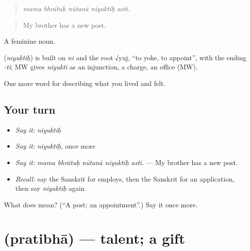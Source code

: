 \begin{quote}
    
\end{quote}

\begin{quote}
\emph{mama bhrātuḥ nūtanā niyuktiḥ asti.}
\end{quote}

\begin{quote}
My brother has a new post.
\end{quote}

A feminine noun.

\begin{cousinweb}
\textbf{} (\emph{niyuktiḥ}) is built on \emph{ni} and the root √yuj, \textquotedblleft{}to yoke, to appoint\textquotedblright{}, with the ending \emph{-ti}; MW gives \emph{niyukti} as an injunction, a charge, an office (MW).
\end{cousinweb}

\begin{grammarlens}[title={What you've built}]
One more word for describing what you lived and felt.
\end{grammarlens}

\subsection*{Your turn}
\begin{itemize}
\raggedright
  \item \emph{Say it:} \emph{niyuktiḥ}
  \item \emph{Say it:} \emph{niyuktiḥ}, once more
  \item \emph{Say it:} \emph{mama bhrātuḥ nūtanā niyuktiḥ asti.} — My brother has a new post.
  \item \emph{Recall:} say the Sanskrit for employs, then the Sanskrit for an application, then say \emph{niyuktiḥ} again
\end{itemize}

\begin{tcolorbox}[breakable,colback=teal!4,colframe=teal!35!black,title={Before you move on}]
What does  mean? (\textquotedblleft{}A post; an appointment\textquotedblright{}.) Say it once more.
\end{tcolorbox}
\section[\texorpdfstring{\sk{प्रतिभा} (pratibhā)}{प्रतिभा (pratibhā)}]{ (pratibhā) — talent; a gift}

